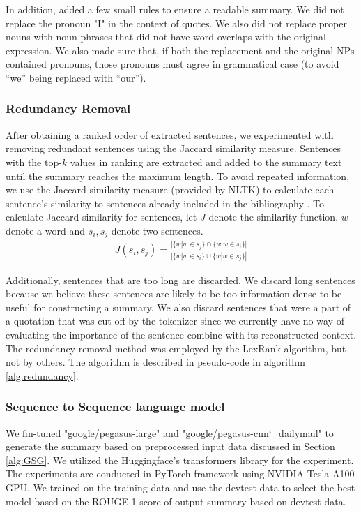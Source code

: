In addition, added a few small rules to ensure a readable summary. We did not replace the pronoun "I" in the context of quotes. We also did not replace proper nouns with noun phrases that did not have word overlaps with the original expression. We also made sure that, if both the replacement and the original NPs contained pronouns, those pronouns must agree in grammatical case (to avoid ``we'' being replaced with ``our'').

\subsubsection{Redundancy Removal}\label{sec:redundancy}

After obtaining a ranked order of extracted sentences, we experimented with removing redundant sentences using the Jaccard similarity measure. Sentences with the top-$k$ values in ranking are extracted and added to the summary text until the summary reaches the maximum length. To avoid repeated information, we use the Jaccard similarity measure (provided by NLTK) to calculate each sentence's similarity to sentences already included in the bibliography \cite{bird-loper-2004-nltk}. To calculate Jaccard similarity for sentences, let $J$ denote the similarity function, $w$ denote a word and $s_i, s_j$ denote two sentences.
\begin{align} 
    J(s_i, s_j) = \frac{|\{w|w\in s_j\} \cap \{w|w\in s_i\}|}{|\{w|w\in s_i\} \cup \{w|w\in s_j\}|}
\end{align}

\noindent Additionally, sentences that are too long are discarded. We discard long sentences because we believe these sentences are likely to be too information-dense to be useful for constructing a summary. We also discard sentences that were a part of a quotation that was cut off by the tokenizer since we currently have no way of evaluating the importance of the sentence combine with its reconstructed context. The redundancy removal method was employed by the LexRank algorithm, but not by others. The algorithm is described in pseudo-code in algorithm \ref{alg:redundancy}. 



\subsubsection{Sequence to Sequence language model}
We fin-tuned "google/pegasus-large" and "google/pegasus-cnn\char`_dailymail" to generate the summary based on preprocessed input data discussed in Section \ref{alg:GSG}. We utilized the Huggingface's transformers library for the experiment. The experiments are conducted in PyTorch framework using NVIDIA Tesla A100 GPU. We trained on the training data and use the devtest data to select the best model based on the ROUGE 1 score of output summary based on devtest data.